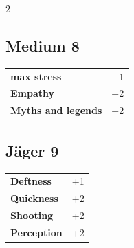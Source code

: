 \begin{multicols}{2}
\begin{tcolorbox}

\end{tcolorbox}

\begin{tcolorbox}
    \subsection*{Medium \hfill \small{8 }}
    \tcblower




\begin{tabular}{@{}ll@{}}
    \textbf{max stress} & +1\\
    \textbf{Empathy} & +2\\
    \textbf{Myths and legends} & +2\\
\end{tabular}


\end{tcolorbox}

\begin{tcolorbox}
    \subsection*{Jäger \hfill \small{9 }}
    \tcblower




\begin{tabular}{@{}ll@{}}
    \textbf{Deftness} & +1\\
    \textbf{Quickness} & +2\\
    \textbf{Shooting} & +2\\
    \textbf{Perception} & +2\\
\end{tabular}


\end{tcolorbox}


\end{multicols}
